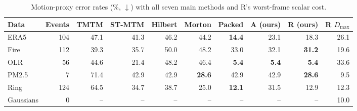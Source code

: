 \begin{table}[t]
\caption{Motion-proxy error rates (\%, $\downarrow$) with all seven main methods and R's worst-frame scalar cost.}\label{tab:motion}
\centering\footnotesize
\setlength{\tabcolsep}{3pt}
\begin{tabular}{lrrrrrrrrr}\toprule
Data & Events & TMTM & ST-MTM & Hilbert & Morton & Packed & \textbf{A (ours)} & \textbf{R (ours)} & R $D_{\max}$\\\midrule
ERA5 & 104 & 47.1 & 41.3 & 46.2 & 44.2 & \textbf{14.4} & 23.1 & 18.3 & 26.1\\
Fire & 112 & 39.3 & 35.7 & 50.0 & 48.2 & 33.0 & 32.1 & \textbf{31.2} & 19.6\\
OLR & 56 & 44.6 & 21.4 & 48.2 & 46.4 & \textbf{5.4} & \textbf{5.4} & \textbf{5.4} & 33.6\\
PM2.5 & 7 & 71.4 & 42.9 & 42.9 & \textbf{28.6} & 42.9 & 42.9 & \textbf{28.6} & 9.5\\
Ring & 124 & 64.5 & 34.7 & 38.7 & 25.0 & \textbf{12.1} & 31.5 & 12.9 & 12.3\\
Gaussians & 0 & -- & -- & -- & -- & -- & -- & -- & 10.0\\
\bottomrule\end{tabular}
\par{}
\end{table}
